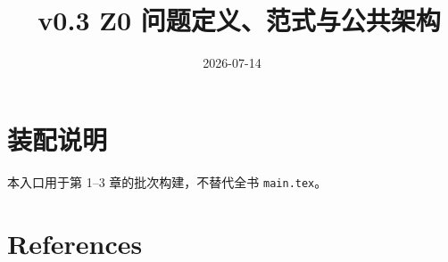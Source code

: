 \documentclass[UTF8,a4paper,12pt,openany]{ctexbook}
\title{\ReportTitle\ v0.3 Z0 问题定义、范式与公共架构}
\author{\ReportAuthor}
\date{2026-07-14}
\begin{document}
\frontmatter
\maketitle
\chapter*{装配说明}
本入口用于第 1--3 章的批次构建，不替代全书 \texttt{main.tex}。
\tableofcontents
\mainmatter



\backmatter
\chapter{References}
\printbibliography[heading=none]
\end{document}
